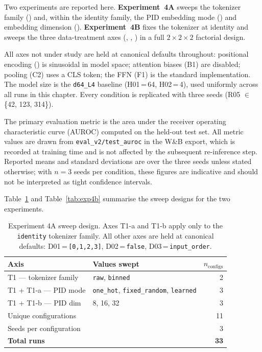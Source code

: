 Two experiments are reported here.
\textbf{Experiment~4A} sweeps the tokenizer family () and, within the identity family, the PID embedding mode () and embedding dimension ().
\textbf{Experiment~4B} fixes the tokenizer at identity and sweeps the three data-treatment axes (, , ) in a full $2 \times 2 \times 2$ factorial design.

All axes not under study are held at canonical defaults throughout:
positional encoding () is sinusoidal in model space;
attention biases (B1) are disabled;
pooling (C2) uses a CLS token;
the FFN (F1) is the standard implementation.
The model size is the \texttt{d64\_L4} baseline (H01\,=\,64, H02\,=\,4), used uniformly across all runs in this chapter.
Every condition is replicated with three seeds (R05 $\in$ \{42, 123, 314\}).

The primary evaluation metric is the area under the receiver operating characteristic curve (AUROC) computed on the held-out test set.
All metric values are drawn from \texttt{eval\_v2/test\_auroc} in the W\&B export, which is recorded at training time and is not affected by the subsequent re-inference step.
Reported means and standard deviations are over the three seeds unless stated otherwise; with $n=3$ seeds per condition, these figures are indicative and should not be interpreted as tight confidence intervals.

Table~\ref{tab:exp4a} and Table~\ref{tab:exp4b} summarise the sweep designs for the two experiments.

\begin{table}[h]
\centering
\small
\begin{tabular}{llr}
\toprule
Axis & Values swept & $n_\text{configs}$ \\
\midrule
T1 — tokenizer family & \texttt{raw}, \texttt{binned} & 2 \\
T1 + T1-a — PID mode & \texttt{one\_hot}, \texttt{fixed\_random}, \texttt{learned} & 3 \\
T1 + T1-b — PID dim & 8, 16, 32 & 3 \\
\midrule
Unique configurations & & 11 \\
Seeds per configuration & & 3 \\
\textbf{Total runs} & & \textbf{33} \\
\bottomrule
\end{tabular}
\caption{Experiment 4A sweep design.
Axes T1-a and T1-b apply only to the \texttt{identity} tokenizer family.
All other axes are held at canonical defaults: D01\,=\,\texttt{[0,1,2,3]}, D02\,=\,\texttt{false}, D03\,=\,\texttt{input\_order}.}
\label{tab:exp4a}
\end{table}

